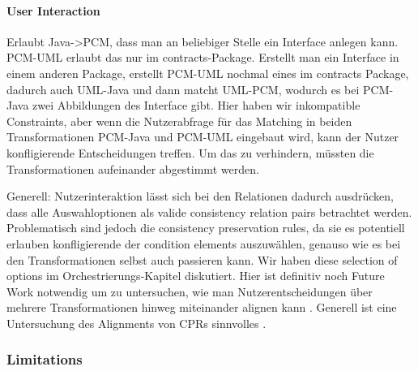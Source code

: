 \paragraph{User Interaction}
Erlaubt Java->PCM, dass man an beliebiger Stelle ein Interface anlegen kann. PCM-UML erlaubt das nur im contracts-Package. Erstellt man ein Interface in einem anderen Package, erstellt PCM-UML nochmal eines im contracts Package, dadurch auch UML-Java und dann matcht UML-PCM, wodurch es bei PCM-Java zwei Abbildungen des Interface gibt. Hier haben wir inkompatible Constraints, aber wenn die Nutzerabfrage für das Matching in beiden Transformationen PCM-Java und PCM-UML eingebaut wird, kann der Nutzer konfligierende Entscheidungen treffen. Um das zu verhindern, müssten die Transformationen aufeinander abgestimmt werden.

Generell: Nutzerinteraktion lässt sich bei den Relationen dadurch ausdrücken, dass alle Auswahloptionen als valide consistency relation pairs betrachtet werden.
Problematisch sind jedoch die consistency preservation rules, da sie es potentiell erlauben konfligierende der condition elements auszuwählen, genauso wie es bei den Transformationen selbst auch passieren kann.
Wir haben diese selection of options im Orchestrierungs-Kapitel diskutiert.
Hier ist definitiv noch Future Work notwendig um zu untersuchen, wie man Nutzerentscheidungen über mehrere Transformationen hinweg miteinander alignen kann .
Generell ist eine Untersuchung des Alignments von CPRs sinnvolles .


\subsubsection{Limitations}
